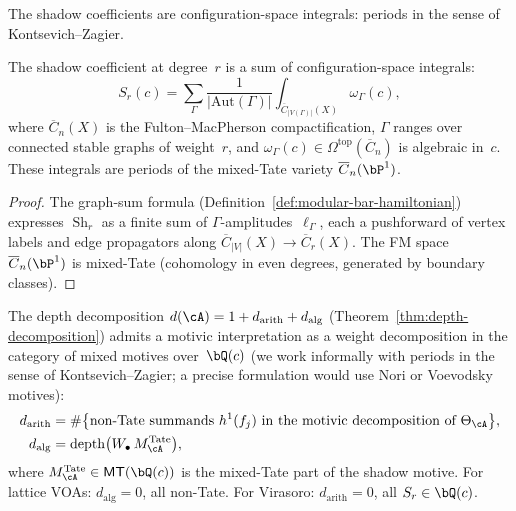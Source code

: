 The shadow coefficients are configuration-space integrals:
periods in the sense of Kontsevich--Zagier.

\begin{proposition}
\label{prop:shadow-periods}
\ClaimStatusProvedHere
{}
The shadow coefficient at degree~$r$ is a sum of
configuration-space integrals:
\begin{equation}\label{eq:shadow-period}
 S_r(c)
 = \sum_\Gamma \frac{1}{|\mathrm{Aut}(\Gamma)|}
 \int_{\overline{C}_{|V(\Gamma)|}(X)} \omega_\Gamma(c),
\end{equation}
where $\overline{C}_n(X)$ is the Fulton--MacPherson
compactification, $\Gamma$ ranges over
connected stable graphs of weight~$r$, and
$\omega_\Gamma(c) \in \Omega^{\mathrm{top}}(\overline{C}_n)$ is
algebraic in~$c$.
These integrals are periods of the mixed-Tate variety
$\overline{C}_n(\bP^1)$.
\end{proposition}

\begin{proof}
The graph-sum formula
(Definition~\ref{def:modular-bar-hamiltonian}) expresses
$\operatorname{Sh}_r$ as a finite sum of
$\Gamma$-amplitudes~$\ell_\Gamma$, each a
pushforward of vertex labels and edge
propagators along $\overline{C}_{|V|}(X) \to \overline{C}_r(X)$.
The FM space $\overline{C}_n(\bP^1)$ is mixed-Tate
(cohomology in even degrees, generated by boundary classes).
\end{proof}

\begin{remark}
\label{rem:motivic-decomposition}
The depth decomposition
$d(\cA) = 1 + d_{\mathrm{arith}} + d_{\mathrm{alg}}$
\textup{(}Theorem~\textup{\ref{thm:depth-decomposition}}\textup{)}
admits a motivic interpretation as a weight decomposition
in the category of mixed motives over~$\bQ(c)$
\textup{(}we work informally with periods in the sense of
Kontsevich--Zagier; a precise formulation would use
Nori or Voevodsky motives\textup{)}:
\begin{align}
 d_{\mathrm{arith}}
 &= \#\bigl\{\text{non-Tate summands } h^1(f_j)
 \text{ in the motivic decomposition of } \Theta_\cA\bigr\},
 \label{eq:d-arith-motivic} \\
 d_{\mathrm{alg}}
 &= \mathrm{depth}\bigl(
 W_\bullet\,M^{\mathrm{Tate}}_\cA
 \bigr),
 \label{eq:d-alg-motivic}
\end{align}
where $M^{\mathrm{Tate}}_\cA \in \mathsf{MT}(\bQ(c))$ is the
mixed-Tate part of the shadow motive.
For lattice VOAs: $d_{\mathrm{alg}} = 0$, all non-Tate.
For Virasoro: $d_{\mathrm{arith}} = 0$, all $S_r \in \bQ(c)$.
\end{remark}



